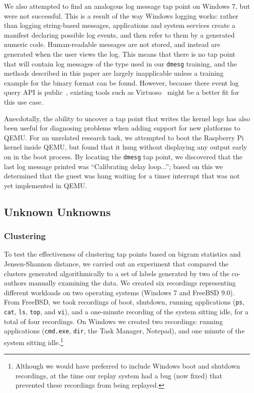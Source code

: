 We also attempted to find an analogous log message tap point on Windows
7, but were not successful. This is a result of the way Windows logging
works: rather than logging string-based messages, applications and
system services create a manifest declaring possible log events, and
then refer to them by a generated numeric code. Human-readable messages
are not stored, and instead are generated when the user views the log.
This means that there is no tap point that will contain log messages of
the type used in our \texttt{dmesg} training, and the methods described
in this paper are largely inapplicable unless a training example for the
binary format can be found. However, because there event log query API
is public~\cite{evtquery}, existing tools such as
Virtuoso~\cite{Dolan-Gavitt:2011uq} might be a better fit for this use
case.

Anecdotally, the ability to uncover a tap point that writes the kernel
logs has also been useful for diagnosing problems when adding support
for new platforms to QEMU. For an unrelated research task, we attempted
to boot the Raspberry Pi~\cite{raspberrypi} kernel inside QEMU, but
found that it hung without displaying any output early on in the boot
process. By locating the \texttt{dmesg} tap point, we discovered that
the last log message printed was ``Calibrating delay loop...''; based on
this we determined that the guest was hung waiting for a timer interrupt
that was not yet implemented in QEMU.

\subsection{Unknown Unknowns}
\subsubsection{Clustering}
\label{sec:eval:subsec:cluster}

To test the effectiveness of clustering tap points based on bigram
statistics and Jensen-Shannon distance, we carried out an experiment
that compared the clusters generated algorithmically to a set of labels
generated by two of the co-authors manually examining the data. We
created six recordings representing different workloads on two operating
systems (Windows 7 and FreeBSD 9.0). From FreeBSD, we took recordings of
boot, shutdown, running applications (\texttt{ps}, \texttt{cat},
\texttt{ls}, \texttt{top}, and \texttt{vi}), and a one-minute recording
of the system sitting idle, for a total of four recordings. On Windows
we created two recordings: running applications (\texttt{cmd.exe},
\texttt{dir}, the Task Manager, Notepad), and one minute of the system
sitting idle.\footnote{Although we would have preferred to include
Windows boot and shutdown recordings, at the time our replay system had
a bug (now fixed) that prevented these recordings from being replayed.}

